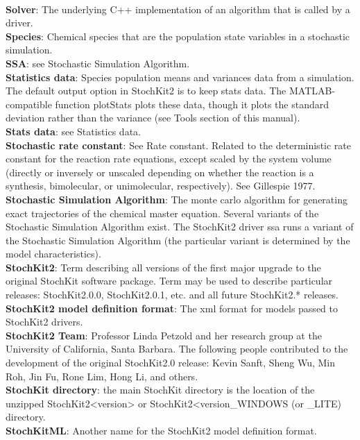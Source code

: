 \documentclass[11pt,letterpaper]{article}
\begin{document}
\begin{itemize}
    \\\textbf{Solver}: The underlying C++ implementation of an algorithm that is called by a driver.
    \\\textbf{Species}: Chemical species that are the population state variables in a stochastic simulation.
    \\\textbf{SSA}: see Stochastic Simulation Algorithm.
    \\\textbf{Statistics data}: Species population means and variances data from a simulation.  The default output option in StochKit2 is to keep stats data.  The MATLAB-compatible function plotStats plots these data, though it plots the standard deviation rather than the variance (see Tools section of this manual).
    \\\textbf{Stats data}: see Statistics data.
    \\\textbf{Stochastic rate constant}: See Rate constant.  Related to the deterministic rate constant for the reaction rate equations, except scaled by the system volume (directly or inversely or unscaled depending on whether the reaction is a synthesis, bimolecular, or unimolecular, respectively).  See Gillespie 1977.
    \\\textbf{Stochastic Simulation Algorithm}: The monte carlo algorithm for generating exact trajectories of the chemical master equation.   Several variants of the Stochastic Simulation Algorithm exist.  The StochKit2 driver ssa runs a variant of the Stochastic Simulation Algorithm (the particular variant is determined by the model characteristics).
    \\\textbf{StochKit2}: Term describing all versions of the first major upgrade to the original StochKit software package.  Term may be used to describe particular releases: StochKit2.0.0, StochKit2.0.1, etc. and all future StochKit2.* releases.
    \\\textbf{StochKit2 model definition format}: The xml format for models passed to StochKit2 drivers.
    \\\textbf{StochKit2 Team}: Professor Linda Petzold and her research group at the University of California, Santa Barbara.  The following people contributed to the development of the original StochKit2.0 release: Kevin Sanft, Sheng Wu, Min Roh, Jin Fu, Rone Lim, Hong Li, and others.
    \\\textbf{StochKit directory}: the main StochKit directory is the location of the unzipped StochKit2<version> or StochKit2<version\_WINDOWS (or \_LITE) directory.
    \\\textbf{StochKitML}: Another name for the StochKit2 model definition format.

\end{itemize}
\end{document}
